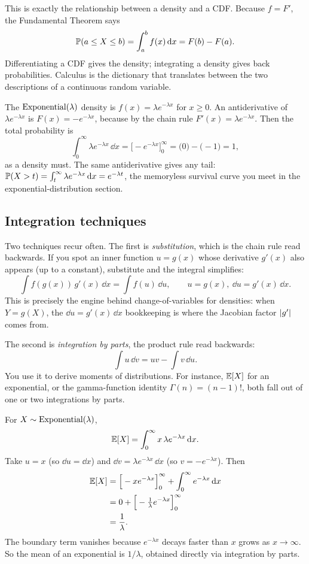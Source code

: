 This is exactly the relationship between a density and a CDF. Because $f=F'$, the Fundamental Theorem
says
\[ \operatorname{\mathbb{P}}(a\le X\le b) = \int_a^b f(x)\,\mathrm{d} x = F(b)-F(a). \]
Differentiating a CDF gives the density;
integrating a density gives back probabilities. Calculus is the dictionary that translates between the
two descriptions of a continuous random variable.

\begin{example}
\label{chAcla:ex-expo}
The $\operatorname{Exponential}(\lambda)$ density is $f(x)=\lambda e^{-\lambda x}$ for $x\ge 0$. An antiderivative of
$\lambda e^{-\lambda x}$ is $F(x)=-e^{-\lambda x}$, because by the chain rule $F'(x)=\lambda
e^{-\lambda x}$. Then the total probability is
\[
  \int_0^\infty \lambda e^{-\lambda x}\,\dd x
  = \Big[-e^{-\lambda x}\Big]_0^\infty
  = \big(0\big)-\big(-1\big) = 1,
\]
as a density must. The same antiderivative gives any tail: $\operatorname{\mathbb{P}}(X>t)=\int_t^\infty \lambda e^{-\lambda
x}\,\mathrm{d} x = e^{-\lambda t}$, the memoryless survival curve you meet in the exponential-distribution
section.
\end{example}

\subsection{Integration techniques}
\label{chAcla:techniques}

Two techniques recur often. The first is \emph{substitution}, which is the chain rule
read backwards. If you spot an inner function $u=g(x)$ whose derivative $g'(x)$ also appears (up to a
constant), substitute and the integral simplifies:
\[
  \int f(g(x))\,g'(x)\,\dd x = \int f(u)\,\dd u, \qquad u=g(x),\ \dd u = g'(x)\,\dd x.
\]
This is precisely the engine behind change-of-variables for densities: when $Y=g(X)$, the $\dd u =
g'(x)\,\dd x$ bookkeeping is where the Jacobian factor $\lvert g'\rvert$ comes from.

The second is \emph{integration by parts}, the product rule read backwards:
\[
  \int u\,\dd v = uv - \int v\,\dd u.
\]
You use it to derive moments of distributions. For instance, $\operatorname{\mathbb{E}}[X]$ for an exponential, or the
gamma-function identity $\Gamma(n)=(n-1)!$, both fall out of one or two integrations by parts.

\begin{example}
\label{chAcla:ex-mean-expo}
For $X\sim\operatorname{Exponential}(\lambda)$,
\[
  \operatorname{\mathbb{E}}[X]=\int_0^\infty x\,\lambda e^{-\lambda x}\,\mathrm{d} x.
\]
Take $u=x$ (so $\dd u=\dd x$) and $\dd v=\lambda e^{-\lambda x}\,\dd x$ (so $v=-e^{-\lambda x}$).
Then
\begin{align*}
  \operatorname{\mathbb{E}}[X] &= \Big[-x e^{-\lambda x}\Big]_0^\infty + \int_0^\infty e^{-\lambda x}\,\mathrm{d} x \\
  &= 0 + \Big[-\tfrac1\lambda e^{-\lambda x}\Big]_0^\infty \\
  &= \frac1\lambda.
\end{align*}
The boundary term vanishes because $e^{-\lambda x}$ decays faster than $x$ grows as $x\to\infty$. So the mean
of an exponential is $1/\lambda$, obtained directly via integration by parts.
\end{example}


